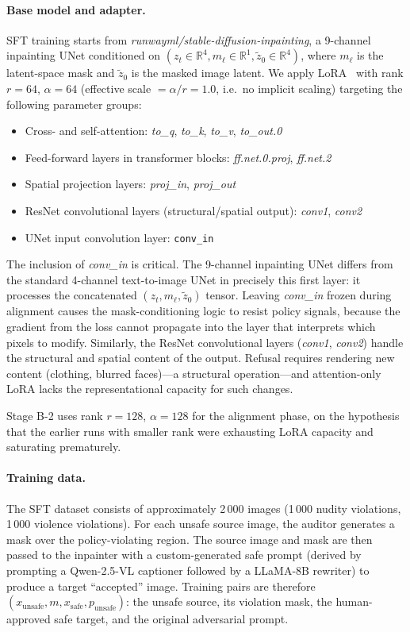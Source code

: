 \paragraph{Base model and adapter.}
SFT training starts from \emph{runwayml/stable-diffusion-inpainting}, a
9-channel inpainting UNet conditioned on
$(z_t \in \mathbb{R}^{4}, m_\ell \in \mathbb{R}^{1}, \tilde{z}_0 \in
\mathbb{R}^{4})$, where $m_\ell$ is the latent-space mask and $\tilde{z}_0$
is the masked image latent.
We apply LoRA~\cite{hu2022lora} with rank $r{=}64$, $\alpha{=}64$
(effective scale $= \alpha/r = 1.0$, i.e.\ no implicit scaling)
targeting the following parameter groups:
\begin{itemize}[leftmargin=1.5em,itemsep=1pt,topsep=2pt]
  \item Cross- and self-attention:
        \emph{to\_q}, \emph{to\_k}, \emph{to\_v}, \emph{to\_out.0}
  \item Feed-forward layers in transformer blocks:
        \emph{ff.net.0.proj}, \emph{ff.net.2}
  \item Spatial projection layers: \emph{proj\_in}, \emph{proj\_out}
  \item ResNet convolutional layers (structural/spatial output):
        \emph{conv1}, \emph{conv2}
  \item UNet input convolution layer: \texttt{conv\_in}
\end{itemize}

The inclusion of \emph{conv\_in} is critical.
The 9-channel inpainting UNet differs from the standard 4-channel text-to-image
UNet in precisely this first layer: it processes the concatenated
$(z_t, m_\ell, \tilde{z}_0)$ tensor.
Leaving \emph{conv\_in} frozen during alignment causes the
mask-conditioning logic to resist policy signals, because the gradient
from the loss cannot propagate into the layer that interprets which pixels
to modify.
Similarly, the ResNet convolutional layers (\emph{conv1}, \emph{conv2})
handle the structural and spatial content of the output.
Refusal requires rendering new content (clothing, blurred faces)---a
structural operation---and attention-only LoRA lacks the representational
capacity for such changes.

Stage B-2 uses rank $r{=}128$, $\alpha{=}128$ for the alignment phase,
on the hypothesis that the earlier runs with smaller rank were exhausting
LoRA capacity and saturating prematurely.

\paragraph{Training data.}
The SFT dataset consists of approximately 2\,000 images (1\,000 nudity
violations, 1\,000 violence violations).
For each unsafe source image, the auditor generates a mask over the
policy-violating region.
The source image and mask are then passed to the inpainter with a
custom-generated safe prompt (derived by prompting a Qwen-2.5-VL captioner
followed by a LLaMA-8B rewriter) to produce a target ``accepted'' image.
Training pairs are therefore $(x_\text{unsafe}, m, x_\text{safe}, p_\text{unsafe})$:
the unsafe source, its violation mask, the human-approved safe target, and
the original adversarial prompt.

